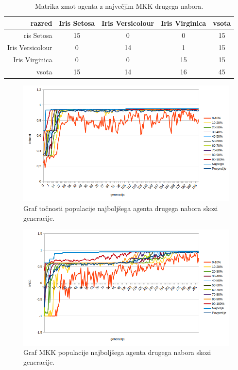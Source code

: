 \begin{table}[H]
    \centering
    \begin{tabular}{||rcccc||}
        \hline
        razred           & Iris Setosa & Iris Versicolour & Iris Virginica & vsota \\ \hline
        ris Setosa       & 15          & 0                & 0              & 15    \\ \hline
        Iris Versicolour & 0           & 14               & 1              & 15    \\ \hline
        Iris Virginica   & 0           & 0                & 15             & 15    \\ \hline
        vsota            & 15          & 14               & 16             & 45    \\ \hline
    \end{tabular}
    \caption{Matrika zmot agenta z največjim MKK drugega nabora.}
    \label{tab:iris_mcc_2}
\end{table}

\begin{figure}[H]
    \begin{center}
        \includegraphics[width=13cm]{iris/2/acc}
    \end{center}
    \caption{Graf točnosti populacije najboljšega agenta drugega nabora skozi generacije.}
    \label{fig:iris_acc_2}
\end{figure}

\begin{figure}[H]
    \begin{center}
        \includegraphics[width=13cm]{iris/2/mcc}
    \end{center}
    \caption{Graf MKK populacije najboljšega agenta drugega nabora skozi generacije.}
    \label{fig:iris_mcc_2}
\end{figure}

